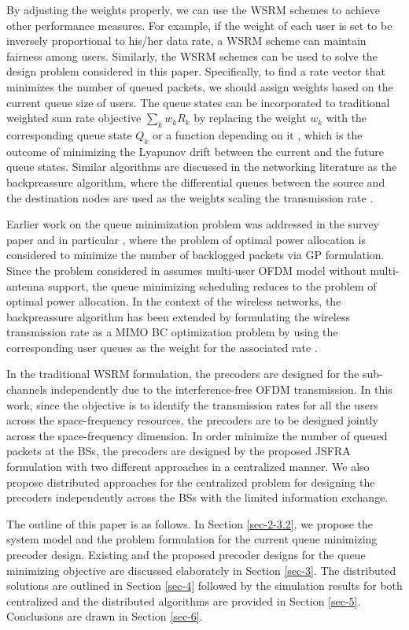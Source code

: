 By adjusting the weights properly, we can use the \ac{WSRM} schemes to achieve other performance measures. For example, if the weight of each user is set to be inversely proportional to his/her data rate, a \ac{WSRM} scheme can maintain fairness among users. Similarly, the \ac{WSRM} schemes can be used to solve the design problem considered in this paper. Specifically, to find a rate vector that minimizes the number of queued packets, we should assign weights based on the current queue size of users. The queue states can be incorporated to traditional weighted sum rate objective $\sum_k w_k R_k$ by replacing the weight $w_k$ with the corresponding queue state $Q_k$ or a function depending on it \cite{tassiulas,neely2010stochastic}, which is the outcome of minimizing the Lyapunov drift between the current and the future queue states. Similar algorithms are discussed in the networking literature as the backpreassure algorithm, where the differential queues between the source and the destination nodes are used as the weights scaling the transmission rate \cite{georgiadis2006resource}.

Earlier work on the queue minimization problem was addressed in the survey paper \cite{berry2004cross} and in particular \cite{qps_cioffi}, where the problem of optimal power allocation is considered to minimize the number of backlogged packets via \acl{GP} formulation. Since the problem considered in \cite{qps_cioffi} assumes multi-user \ac{OFDM} model without multi-antenna support, the queue minimizing scheduling reduces to the problem of optimal power allocation. In the context of the wireless networks, the backpreassure algorithm has been extended by formulating the wireless transmission rate as a \ac{MIMO} \ac{BC} optimization problem by using the corresponding user queues as the weight for the associated rate \cite{weeraddana2011resource}.

In the traditional \ac{WSRM} formulation, the precoders are designed for the sub-channels independently due to the interference-free \ac{OFDM} transmission. In this work, since the objective is to identify the transmission rates for all the users across the space-frequency resources, the precoders are to be designed jointly across the space-frequency dimension. In order minimize the number of queued packets at the \acp{BS}, the precoders are designed by the proposed \ac{JSFRA} formulation with two different approaches in a centralized manner. We also propose distributed approaches for the centralized problem for designing the precoders independently across the \acp{BS} with the limited information exchange.

The outline of this paper is as follows. In Section \ref{sec-2-3.2}, we propose the system model and the problem formulation for the current queue minimizing precoder design. Existing and the proposed precoder designs for the queue minimizing objective are discussed elaborately in Section \ref{sec-3}. The distributed solutions are outlined in Section \ref{sec-4} followed by the simulation results for both centralized and the distributed algorithms are provided in Section \ref{sec-5}. Conclusions are drawn in Section \ref{sec-6}.